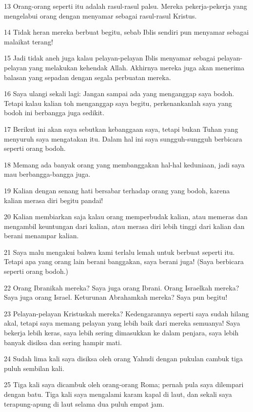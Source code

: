 \par 13 Orang-orang seperti itu adalah rasul-rasul palsu. Mereka pekerja-pekerja yang mengelabui orang dengan menyamar sebagai rasul-rasul Kristus.
\par 14 Tidak heran mereka berbuat begitu, sebab Iblis sendiri pun menyamar sebagai malaikat terang!
\par 15 Jadi tidak aneh juga kalau pelayan-pelayan Iblis menyamar sebagai pelayan-pelayan yang melakukan kehendak Allah. Akhirnya mereka juga akan menerima balasan yang sepadan dengan segala perbuatan mereka.
\par 16 Saya ulangi sekali lagi: Jangan sampai ada yang menganggap saya bodoh. Tetapi kalau kalian toh menganggap saya begitu, perkenankanlah saya yang bodoh ini berbangga juga sedikit.
\par 17 Berikut ini akan saya sebutkan kebanggaan saya, tetapi bukan Tuhan yang menyuruh saya mengatakan itu. Dalam hal ini saya sungguh-sungguh berbicara seperti orang bodoh.
\par 18 Memang ada banyak orang yang membanggakan hal-hal keduniaan, jadi saya mau berbangga-bangga juga.
\par 19 Kalian dengan senang hati bersabar terhadap orang yang bodoh, karena kalian merasa diri begitu pandai!
\par 20 Kalian membiarkan saja kalau orang memperbudak kalian, atau memeras dan mengambil keuntungan dari kalian, atau merasa diri lebih tinggi dari kalian dan berani menampar kalian.
\par 21 Saya malu mengakui bahwa kami terlalu lemah untuk berbuat seperti itu. Tetapi apa yang orang lain berani banggakan, saya berani juga! (Saya berbicara seperti orang bodoh.)
\par 22 Orang Ibranikah mereka? Saya juga orang Ibrani. Orang Israelkah mereka? Saya juga orang Israel. Keturunan Abrahamkah mereka? Saya pun begitu!
\par 23 Pelayan-pelayan Kristuskah mereka? Kedengarannya seperti saya sudah hilang akal, tetapi saya memang pelayan yang lebih baik dari mereka semuanya! Saya bekerja lebih keras, saya lebih sering dimasukkan ke dalam penjara, saya lebih banyak disiksa dan sering hampir mati.
\par 24 Sudah lima kali saya disiksa oleh orang Yahudi dengan pukulan cambuk tiga puluh sembilan kali.
\par 25 Tiga kali saya dicambuk oleh orang-orang Roma; pernah pula saya dilempari dengan batu. Tiga kali saya mengalami karam kapal di laut, dan sekali saya terapung-apung di laut selama dua puluh empat jam.
